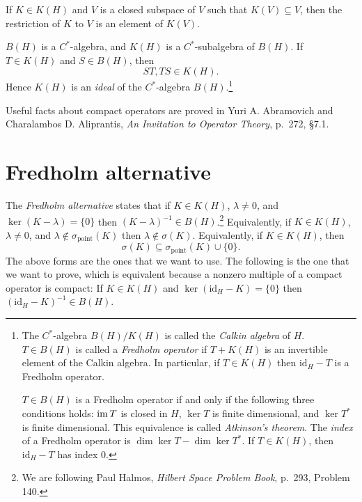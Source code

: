 \documentclass{article}
\newcommand{\im}{\textrm{im\,}}
\newcommand{\point}{\sigma_{\textrm{point}}}
\newcommand{\id}{\textrm{id}}
\begin{document}
If $K \in K(H)$  and $V$ is a closed subspace of $V$ such that $K(V) \subseteq V$, then the restriction of $K$ to $V$ is an element of $K(V)$.

$B(H)$ is a $C^*$-algebra, and $K(H)$ is a $C^*$-subalgebra of $B(H)$. 
If $T \in K(H)$ and $S \in
B(H)$, then
\[
ST, TS \in K(H).
\]
Hence $K(H)$ is an {\em ideal} of the $C^*$-algebra $B(H)$.\footnote{The $C^*$-algebra
$B(H)/K(H)$ is called the {\em Calkin algebra} of $H$. $T \in B(H)$ is called a {\em Fredholm operator}
if $T+K(H)$ is an invertible element of the Calkin algebra.
 In particular, if $T \in K(H)$ then $\id_H-T$ is a Fredholm operator.
 
 $T \in B(H)$ is a Fredholm operator if and only if the following three conditions holds: $\im T$ is closed in $H$, 
 $\ker T$ is finite dimensional, and $\ker T^*$ is finite dimensional. This equivalence is called {\em Atkinson's theorem}.
The {\em index} of a Fredholm operator is $\dim \ker T - \dim \ker T^*$. If $T \in K(H)$, then $\id_H -T$ has index $0$.}

Useful facts about compact operators are proved in
Yuri A. Abramovich and Charalambos D. Aliprantis,
{\em An Invitation to Operator Theory}, 
p.~272, \S 7.1.

\section{Fredholm alternative}
The {\em Fredholm alternative} states that
if $K \in K(H)$, $\lambda \neq 0$, and  $\ker(K-\lambda) = \{0\}$ then $(K-\lambda)^{-1} \in B(H)$.\footnote{We are following Paul Halmos, {\em Hilbert Space Problem Book}, 
p.~293, Problem 140.} Equivalently, 
if $K \in K(H)$, $\lambda \neq 0$, and $\lambda \not \in \point(K)$ then
$\lambda \not \in \sigma(K)$.
Equivalently, if
$K \in K(H)$, then
\[
\sigma(K) \subseteq \point(K) \cup \{0\}.
\]
The above forms are the ones that we want to use. The following is the one that we want to prove, which is equivalent because
a nonzero multiple of a compact operator is compact: If $K \in K(H)$ and $\ker(\id_H - K)=\{0\}$ then $(\id_H-K)^{-1} \in B(H)$.
\end{document}
